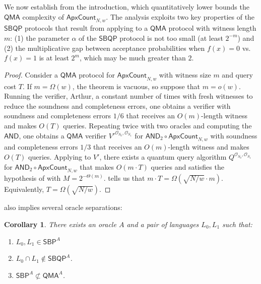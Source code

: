 \documentclass[10pt,a4paper]{article}
\newtheorem{corollary}[theorem]{Corollary}
\newcommand{\<}{\langle}
\renewcommand{\>}{\rangle}
\newcommand{\ApxCount}{\mathsf{ApxCount}_{N,w}}
\newcommand{\AndApxCount}{\mathsf{AND}_2\circ\mathsf{ApxCount}_{N,w}}
\begin{document}
We now establish  from the introduction,
which quantitatively 
lower bounds the $\mathsf{QMA}$ complexity of $\mathsf{ApxCount}_{N,w}$. 
The analysis exploits
two key properties of the $\mathsf{SBQP}$ protocols that result
from applying  to 
a $\mathsf{QMA}$ protocol with witness length $m$: 
(1) the 
parameter $\alpha$ of the $\mathsf{SBQP}$
protocol is not too small (at least $2^{-m}$)
and (2) the multiplicative gap between acceptance probabilities when $f(x)=0$
vs. $f(x)=1$ is at least $2^m$, which may be much greater than $2$.

\qmabound*

\begin{proof}
Consider a $\mathsf{QMA}$
protocol for $\ApxCount$ with witness size $m$ and query cost $T$. If $m=\Omega(w)$, the theorem is vacuous, so suppose
that $m=o(w)$. Running the verifier, Arthur, a constant number of times with fresh witnesses to reduce the soundness and completeness errors, one obtains a verifier with soundness and completeness errors $1/6$ that receives an $O(m)$-length witness and makes $O(T)$ queries. 
Repeating twice with two oracles and computing the $\mathsf{AND}$, one obtains a $\mathsf{QMA}$ verifier $V'^{\mathcal{O}_{S_0},\mathcal{O}_{S_1}}$ for $\AndApxCount$ with soundness and completeness errors $1/3$ that receives an $O(m)$-length witness and makes $O(T)$ queries. 
Applying  to $V'$, there exists a quantum query algorithm $Q^{\mathcal{O}_{S_0},\mathcal{O}_{S_1}}$ for $\AndApxCount$ that makes $O(m \cdot T)$ queries and satisfies the hypothesis of  with $M=2^{-\Theta(m)}$.  tells us that $m \cdot T = \Omega\left(\sqrt{N/w} \cdot m\right)$.
Equivalently, $T = \Omega\left(\sqrt{N/w}\right)$.
\end{proof}

 also implies several oracle separations:

\begin{corollary}
\label{cor:qma_separation} There exists an oracle $A$ and a pair of
languages $L_0, L_1$ such that:

\begin{enumerate}
\item $L_0, L_1 \in \mathsf{SBP}^A$

\item $L_0 \cap L_1 \not\in \mathsf{SBQP}^A$.

\item $\mathsf{SBP}^A \not\subset \mathsf{QMA}^A$.
\end{enumerate}
\end{corollary}
\end{document}

